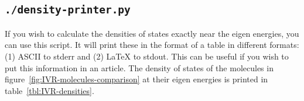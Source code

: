 \subsection{\texttt{./density-printer.py}}

If you wish to calculate the densities of states exactly near the eigen energies, you can use this script. It will print these in the format of a table in different formats: (1) ASCII to stderr and (2) LaTeX to stdout. This can be useful if you wish to put this information in an article. The density of states of the molecules in figure~\ref{fig:IVR-molecules-comparison} at their eigen energies is printed in table~\ref{tbl:IVR-densities}.

\begin{table}[h]
	\centering
	
	\caption{Density of states of our $\Delta_\mathrm{PV}$ candidates, at each vibrational energy.}
	\label{tbl:IVR-densities}
\end{table}
